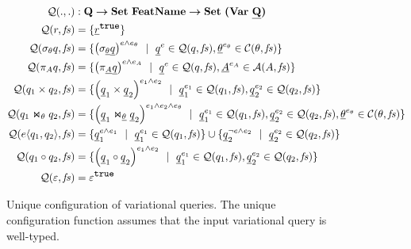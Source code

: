 \begin{figure}[ht!]
\begin{alignat*}{1}
\qGroup [.] . &: \qSet \totype  \settype \fSet \totype \settype {\bm{(} \vartype \pQSet \bm{)}}\\
%
\qGroup \vRel &= \setDef {\annot [\t] \pRel}\\
\qGroup {\vSel \vQ}  &=  
\setDef {\annot [\dimMeta \wedge \dimMeta_\vCond] {\left(\sigma_{\pCond} \pQ\right)} \myOR
\annot \pQ \in \qGroup \vQ, \annot [\dimMeta_\vCond] \pCond \in \cGroup}
\\
%
\qGroup {\vPrj [\vAttList] \vQ} &= 
\setDef {\annot [\dimMeta \wedge \dimMeta_\vAttList] {\left(\pi_{\pAttList} \pQ \right)} \myOR
\annot \pQ \in \qGroup \vQ, \annot [\dimMeta_\vAttList] \pAttList \in \aGroup}
\\
%
\qGroup {{\vQ_1} \times {\vQ_2}} &= 
\setDef {\annot [\dimMeta_1 \wedge \dimMeta_2] {\left(\pQ_1 \times \pQ_2\right)} \myOR
\annot [\dimMeta_1] \pQ_1 \in \qGroup {\vQ_1}, \annot [\dimMeta_2] \pQ_2 \in \qGroup {\vQ_2} }
\\
%
\qGroup {{\vQ_1} \Join_\vCond {\vQ_2}} &= 
\setDef {\annot [\dimMeta_1 \wedge \dimMeta_2 \wedge \dimMeta_\vCond] {\left(\pQ_1 \Join_{\pCond} \pQ_2 \right)} \myOR 
\annot [\dimMeta_1] \pQ_1 \in \qGroup {\vQ_1}, \annot [\dimMeta_2] \pQ_2 \in \qGroup {\vQ_2}
,\annot [\dimMeta_\vCond] \pCond \in \cGroup  }
\\
%
\qGroup {\chc {\vQ_1, \vQ_2}} &= 
\setDef {\annot [\dimMeta \wedge \dimMeta_1] \pQ_1 \myOR  \annot [\dimMeta_1] \pQ_1 \in \qGroup {\vQ_1} }
\cup 
\setDef {\annot [\neg \dimMeta \wedge \dimMeta_2] \pQ_2 \myOR  \annot [\dimMeta_2] \pQ_2 \in \qGroup {\vQ_2}}  \\
%
\qGroup {{\vQ_1} \circ {\vQ_2}} &= 
\setDef {\annot [\dimMeta_1 \wedge \dimMeta_2] {\left(\pQ_1 \circ \pQ_2\right)} \myOR
\annot [\dimMeta_1] \pQ_1 \in \qGroup {\vQ_1}, \annot [\dimMeta_2] \pQ_2 \in \qGroup {\vQ_2} }\\
%
\qGroup {\empRel} &= \annot [\t] { \empRel}
\end{alignat*}
\caption[Unique configuration of variational queries]{Unique configuration of variational queries. 
The unique configuration function assumes that the input variational query is well-typed.
}
\label{fig:vq-group}
\end{figure}
